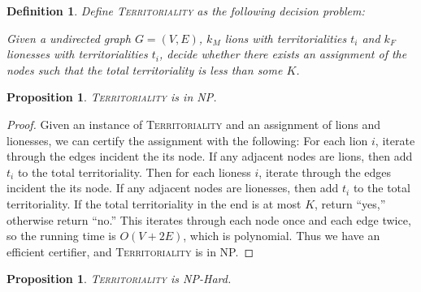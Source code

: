 \documentclass[10pt]{article}
\newtheorem{proposition}[lemma]{Proposition}
\newtheorem{definition}{Definition}
\begin{document}
\begin{definition}
  Define \textsc{Territoriality} as the following decision problem:

  Given a undirected graph \(G = (V, E)\), \(k_M\) lions with territorialities \(t_i\) and \(k_F\) lionesses with territorialities \(t_i\), decide whether there exists an assignment of the nodes such that the total territoriality is less than some \(K\).
\end{definition}

\begin{proposition}
  \textsc{Territoriality} is in NP.
\end{proposition}

\begin{proof}
  Given an instance of \textsc{Territoriality} and an assignment of lions and lionesses, we can certify the assignment with the following: For each lion \(i\), iterate through the edges incident the its node. If any adjacent nodes are lions, then add \(t_i\) to the total territoriality. Then for each lioness \(i\), iterate through the edges incident the its node. If any adjacent nodes are lionesses, then add \(t_i\) to the total territoriality. If the total territoriality in the end is at most \(K\), return ``yes,'' otherwise return ``no.'' This iterates through each node once and each edge twice, so the running time is \(O(V + 2E)\), which is polynomial. Thus we have an efficient certifier, and \textsc{Territoriality} is in NP.
\end{proof}

\begin{proposition}
  \textsc{Territoriality} is NP-Hard.
\end{proposition}
\end{document}

